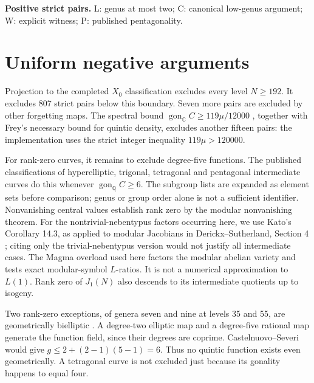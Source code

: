 \documentclass[11pt]{article}
\newcommand{\Q}{\mathbb Q}
\newcommand{\gon}{\operatorname{gon}}
\theoremstyle{remark}\newtheorem{remark}[theorem]{Remark}
\begin{document}
\clearpage
\begin{center}
\textbf{Positive strict pairs.}\quad
L: genus at most two; C: canonical low-genus argument;
W: explicit witness; P: published pentagonality.
\end{center}
\begingroup\small

\endgroup

\section{Uniform negative arguments}
Projection to the completed $X_0$ classification excludes every level
$N\ge192$. It excludes 807 strict pairs below this boundary. Seven more
pairs are excluded by other forgetting maps. The spectral bound
$\gon_{\mathbb C}C\ge119\mu/12000$ \cite[Theorem 3.16]{Orlic}, together with Frey's necessary bound
\cite[Proposition 2.2]{DS}
for quintic density, excludes another fifteen pairs: the implementation
uses the strict integer inequality $119\mu>120000$.

For rank-zero curves, it remains to exclude degree-five functions.
The published classifications of hyperelliptic, trigonal, tetragonal
and pentagonal intermediate curves do this whenever $\gon_{\Q}C\ge6$.
The subgroup lists are expanded as element sets before comparison;
genus or group order alone is not a sufficient identifier.
Nonvanishing central values establish rank zero by the modular
nonvanishing theorem. For the nontrivial-nebentypus factors occurring here,
we use Kato's Corollary 14.3, as applied to modular Jacobians in
Derickx--Sutherland, Section 4 \cite{Kato,DS}; citing only the
trivial-nebentypus version would not justify all intermediate cases.
The Magma overload used here factors the modular
abelian variety and tests exact modular-symbol $L$-ratios. It is not a
numerical approximation to $L(1)$. Rank zero of $J_1(N)$ also descends
to its intermediate quotients up to isogeny.

Two rank-zero exceptions, of genera seven and nine at levels 35 and 55,
are geometrically bielliptic \cite[Theorem 0.2 and Table 6]{JKS}.
A degree-two elliptic map and a degree-five
rational map generate the function field, since their degrees are coprime.
Castelnuovo--Severi would give $g\le2+(2-1)(5-1)=6$. Thus no quintic
function exists even geometrically. A tetragonal curve is not excluded
just because its gonality happens to equal four.
\end{document}
